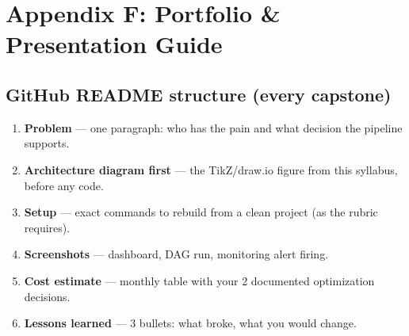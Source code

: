 \documentclass[11pt, a4paper]{article}
\begin{document}
\newpage
\section{Appendix F: Portfolio \& Presentation Guide}

\subsection*{GitHub README structure (every capstone)}
\begin{enumerate}[nosep]
    \item \textbf{Problem} --- one paragraph: who has the pain and what decision the pipeline supports.
    \item \textbf{Architecture diagram first} --- the TikZ/draw.io figure from this syllabus, before any code.
    \item \textbf{Setup} --- exact commands to rebuild from a clean project (as the rubric requires).
    \item \textbf{Screenshots} --- dashboard, DAG run, monitoring alert firing.
    \item \textbf{Cost estimate} --- monthly table with your 2 documented optimization decisions.
    \item \textbf{Lessons learned} --- 3 bullets: what broke, what you would change.
\end{enumerate}
\end{document}
